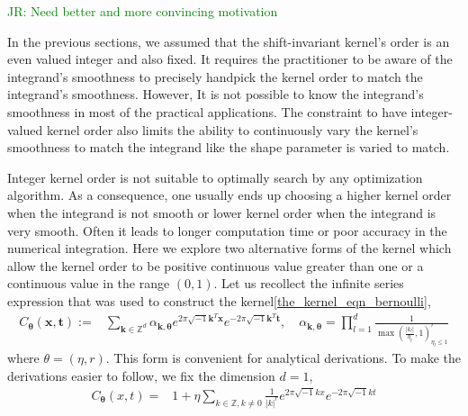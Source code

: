 \documentclass{iitthesis}          %
\newcommand{\bm}[1]{\boldsymbol{#1}}
\newcommand{\vtheta}{{\bm{\theta}}}
\newcommand{\vk}{\bm{k}}
\newcommand{\vt}{\bm{t}}
\newcommand{\vx}{\bm{x}}
\def\abs#1{\ensuremath{\left \lvert #1 \right \rvert}}
\newcommand{\JRNote}[1]{{\textcolor{green}{JR: #1}}}
\begin{document}
\JRNote{Need better and more convincing motivation}

In the previous sections, we assumed that the shift-invariant kernel's order is an even valued integer and also fixed. It requires the practitioner to be aware of the integrand's smoothness to precisely handpick the kernel order to match the integrand's smoothness. However, It is not possible to know the integrand's smoothness in most of the practical applications. The constraint to have integer-valued kernel order also limits the ability to continuously vary the kernel's smoothness to match the integrand like the shape parameter is varied to match. 

Integer kernel order is not suitable to optimally search by any optimization algorithm.
As a consequence, one usually ends up choosing a higher kernel order when the integrand is not  smooth or lower kernel order when the integrand is very smooth.
Often it leads to longer computation time or poor accuracy in the numerical integration.
Here we explore two alternative forms of the kernel which allow the kernel order to be positive continuous value greater than one or a continuous value in the range $(0,1)$. Let us recollect the infinite series expression that was used to construct the kernel\eqref{the_kernel_eqn_bernoulli},
\begin{align*}
C_\vtheta(\vx, \vt) := &  \sum_{\vk \in \mathbb{Z}^d} \alpha_{\vk,\vtheta}  e^{2 \pi\sqrt{-1} \vk^T\vx}
e^{-2 \pi\sqrt{-1} \vk^T\vt}, \quad \alpha_{\vk,\vtheta} = \prod_{l=1}^d \frac{1}{\max(\frac{|k_l|}{\eta_l},1)^r_{\eta_l\leq 1}} 
\end{align*}
where $\theta = (\eta, r)$.  This form is convenient for analytical derivations.
To make the derivations easier to follow, we fix the dimension $d=1$,
\begin{align*}
C_\vtheta(x, t) = & 1 + \eta \sum_{k \in \mathbb{Z}, k \neq 0 } \frac{1}{\abs{k}^r} 
e^{ 2 \pi\sqrt{-1} k x}
e^{-2 \pi\sqrt{-1} k t}
\end{align*}
\end{document}
